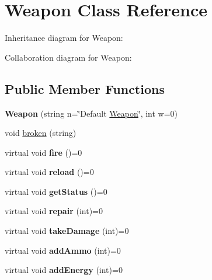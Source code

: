 \hypertarget{classWeapon}{}\section{Weapon Class Reference}
\label{classWeapon}


Inheritance diagram for Weapon\+:


Collaboration diagram for Weapon\+:
\subsection*{Public Member Functions}
\begin{DoxyCompactItemize}
\item 
\mbox{\label{classWeapon_a2376c26cc7d7e14f84f9e0f65a6bb3b8}} 
{\bfseries Weapon} (string n=\char`\"{}Default \hyperlink{classWeapon}{Weapon}\char`\"{}, int w=0)
\item 
void \hyperlink{classWeapon_ab549867377210181dfa544a042a5862a}{broken} (string)
\item 
\mbox{\label{classWeapon_a11c15f5a1524a8396824fd2f11698d69}} 
virtual void {\bfseries fire} ()=0
\item 
\mbox{\label{classWeapon_a12874b3e25a9f0e28e674c5a9cf9d7e4}} 
virtual void {\bfseries reload} ()=0
\item 
\mbox{\label{classWeapon_a49c263299a3ce6dfe9b4791f21fd8056}} 
virtual void {\bfseries get\+Status} ()=0
\item 
\mbox{\label{classWeapon_ae1dd23d9d29a4165c303e074971fe7df}} 
virtual void {\bfseries repair} (int)=0
\item 
\mbox{\label{classWeapon_ab70aed146335aa2d91dd5d84799de3d8}} 
virtual void {\bfseries take\+Damage} (int)=0
\item 
\mbox{\label{classWeapon_abdc4803596b00c72d5f9f9b62fa0b032}} 
virtual void {\bfseries add\+Ammo} (int)=0
\item 
\mbox{\label{classWeapon_a3434ce3709c5e749b067e7144b66537c}} 
virtual void {\bfseries add\+Energy} (int)=0
\item 

\end{DoxyCompactItemize}
